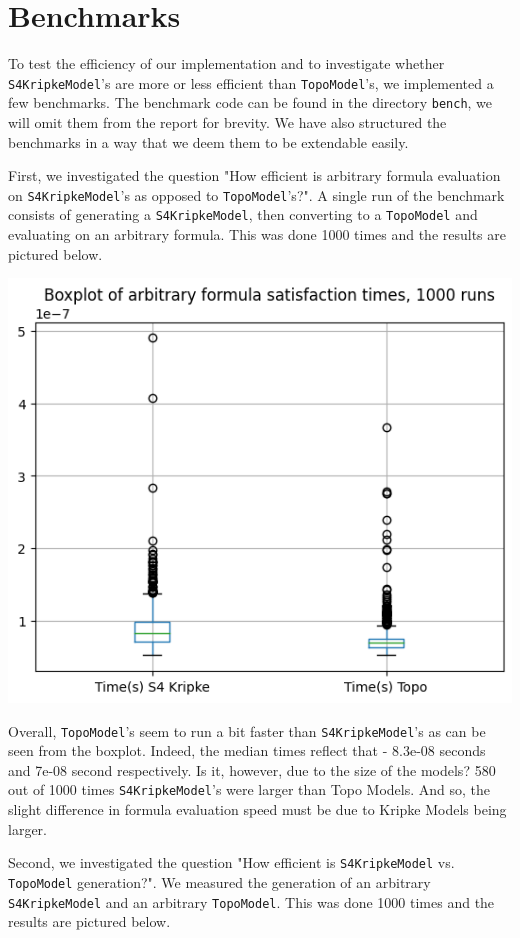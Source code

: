 \documentclass[12pt, a4paper]{article}
\begin{document}
\section{Benchmarks}\label{sec:Benchmarks}

To test the efficiency of our implementation and to investigate whether \verb|S4KripkeModel|'s
are more or less efficient than \verb|TopoModel|'s, we implemented a few benchmarks. The benchmark code
can be found in the directory \verb|bench|, we will omit them from the report for brevity. We have also
structured the benchmarks in a way that we deem them to be extendable easily.

First, we investigated the question "How efficient is arbitrary formula evaluation on \verb|S4KripkeModel|'s
as opposed to \verb|TopoModel|'s?". A single run of the benchmark consists of generating a \verb|S4KripkeModel|,
then converting to a \verb|TopoModel| and evaluating on an arbitrary formula. This was done 1000 times and the
results are pictured below.

\begin{center}
\includegraphics*[width=0.5\linewidth]{bench-formula-satisfaction.png}
\end{center}

Overall, \verb|TopoModel|'s seem to run a bit faster than \verb|S4KripkeModel|'s as can be seen from the boxplot.
Indeed, the median times reflect that - 8.3e-08 seconds and 7e-08 second respectively.
Is it, however, due to the size of the models? 580 out of 1000 times \verb|S4KripkeModel|'s were larger
than Topo Models. And so, the slight difference in formula evaluation speed must be due to
Kripke Models being larger.

Second, we investigated the question "How efficient is \verb|S4KripkeModel| vs. \verb|TopoModel| generation?".
We measured the generation of an arbitrary \verb|S4KripkeModel| and an arbitrary \verb|TopoModel|.
This was done 1000 times and the results are pictured below.
\end{document}
